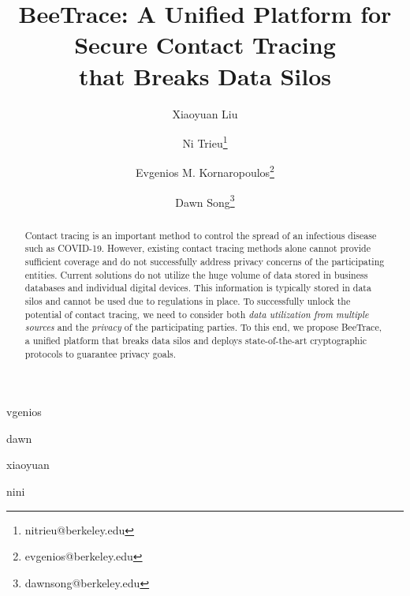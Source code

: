 





\makeatletter
\renewcommand\AB@affilsepx{, \protect\Affilfont}
\makeatother

\newcommand{\sysname}{\textsf{BeeTrace}\xspace}

\newif\ifsubmit
\submitfalse

\newcommand{\reviewer}[3]{
  \expandafter\newcommand\csname #1\endcsname[1]{
    \ifsubmit
      \ignorespaces
    \else
      \textcolor{#3}{[#2: ##1]}
    \fi
  }
}

\reviewer{evgenios}{Evgenios}{red}
\reviewer{dawn}{Dawn}{blue}
\reviewer{xiaoyuan}{Xiaoyuan}{orange}
\reviewer{nini}{Ni}{purple}

\newcommand{\thesystem}{System\xspace}




\title{\sysname: A Unified Platform for Secure Contact Tracing\\ that Breaks Data Silos}


\author[1,2]{Xiaoyuan Liu}
\author[2]{Ni Trieu\thanks{nitrieu@berkeley.edu}}
\author[2]{Evgenios M. Kornaropoulos\thanks{evgenios@berkeley.edu}}
\author[2,3]{Dawn Song\thanks{dawnsong@berkeley.edu}}

\maketitle

\begin{abstract}
    Contact tracing is an important method to control the spread of an infectious disease such as COVID-19. However, existing contact tracing methods alone cannot provide sufficient coverage and do not successfully address privacy concerns of the participating entities. Current solutions do not utilize the huge volume of data stored in business databases and individual digital devices. This information is typically stored in data silos and cannot be used due to regulations in place. To successfully unlock the potential of contact tracing, we need to consider both \emph{data utilization from multiple sources} and the \emph{privacy} of the participating parties. To this end, we propose \sysname, a unified platform that breaks data silos and deploys state-of-the-art cryptographic protocols to guarantee privacy goals. 
\end{abstract}

